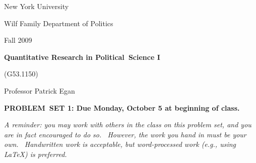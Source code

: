 \documentclass[11pt]{article}
\begin{document}
New York University

Wilf Family Department of Politics

Fall 2009

\begin{center}
{\large \textbf{Quantitative Research in Political\ Science I}}

(G53.1150)

Professor Patrick Egan

\bigskip

\textbf{PROBLEM\ SET 1: Due Monday, October 5 at beginning of class.}
\end{center}

\textit{A reminder: you may work with others in the class on this problem
set, and you are in fact encouraged to do so. \ However, the work you hand
in must be your own. \ Handwritten work is acceptable, but word-processed
work (e.g., using LaTeX) is preferred.}

\bigskip
\end{document}

